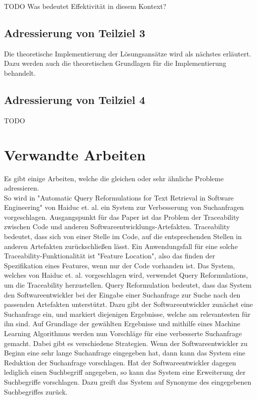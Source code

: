TODO Was bedeutet Effektivität in diesem Kontext?

\subsection*{Adressierung von Teilziel 3}
Die theoretische Implementierung der Lösungsansätze wird als nächstes erläutert.
Dazu werden auch die theoretischen Grundlagen für die Implementierung behandelt.

\subsection*{Adressierung von Teilziel 4}
TODO

\section{Verwandte Arbeiten}

Es gibt einige Arbeiten, welche die gleichen oder sehr ähnliche Probleme adressieren.\\

So wird in "Automatic Query Reformulations for Text Retrieval in Software Engineering" von Haiduc et. al. ein System zur Verbesserung von Suchanfragen vorgeschlagen.
Ausgangspunkt für das Paper ist das Problem der Traceability zwischen Code und anderen Softwareentwicklungs-Artefakten.
Traceability bedeutet, dass sich von einer Stelle im Code, auf die entsprechenden Stellen in anderen Artefakten zurückschließen lässt.
Ein Anwendungsfall für eine solche Traceability-Funktionalität ist "Feature Location", also das finden der Spezifikation eines Features, wenn nur der Code vorhanden ist.
Das System, welches von Haiduc et. al. vorgeschlagen wird, verwendet Query Reformulations, um die Traceability herzustellen.
Query Reformulation bedeutet, dass das System den Softwareentwickler bei der Eingabe einer Suchanfrage zur Suche nach den passenden Artefakten unterstützt.
Dazu gibt der Softwareentwickler zunächst eine Suchanfrage ein, und markiert diejenigen Ergebnisse, welche am relevantesten für ihn sind.
Auf Grundlage der gewählten Ergebnisse und mithilfe eines Machine Learning Algorithmus werden nun Vorschläge für eine verbesserte Suchanfrage gemacht.
Dabei gibt es verschiedene Strategien.
Wenn der Softwareentwickler zu Beginn eine sehr lange Suchanfrage eingegeben hat, dann kann das System eine Reduktion der Suchanfrage vorschlagen.
Hat der Softwareentwickler dagegen lediglich einen Suchbegriff angegeben, so kann das System eine Erweiterung der Suchbegriffe vorschlagen.
Dazu greift das System auf Synonyme des eingegebenen Suchbegriffes zurück.\\

